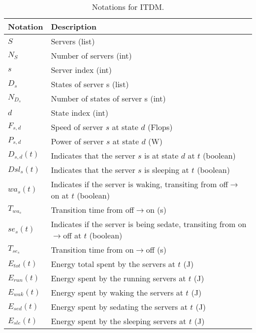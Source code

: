 \begin{table*}[!htb]
\centering
\caption{Notations for ITDM.}
\label{tab:notation_it}
\begin{tabular}{l|l}
    \hline
    Notation & Description \\\hline\hline
    $S$ & Servers (list) \\
    $N_{S}$ & Number of servers (int) \\
    $s$ & Server index (int) \\
    $D_s$ & States of server s (list) \\
    $N_{D_{s}}$ & Number of states of server s (int) \\
    $d$ & State index (int) \\
    $F_{s,d}$ & Speed of server $s$ at state $d$ (Flops)\\
    $P_{s,d}$ & Power of server $s$ at state $d$ (W)\\
    $D_{s,d}(t)$ & Indicates that the server $s$ is at state $d$ at $t$ (boolean)\\
    $Dsl_{s}(t)$ & Indicates that the server $s$ is sleeping at $t$ (boolean)\\
    $wa_s(t)$ & Indicates if the server is waking, transiting from off$\rightarrow$on at $t$ (boolean) \\
    $T_{wa_s}$ & Transition time from off$\rightarrow$on (s) \\
    $se_s(t)$ & Indicates if the server is being sedate, transiting from on$\rightarrow$off at $t$ (boolean) \\
    $T_{se_s}$ & Transition time from on$\rightarrow$off (s) \\    
    $E_{tot}(t)$ & Energy total spent by the servers at $t$ (J) \\
    $E_{run}(t)$ & Energy spent by the running servers at $t$ (J) \\
    $E_{wak}(t)$ & Energy spent by waking the servers at $t$ (J) \\
    $E_{sed}(t)$ & Energy spent by sedating the servers at $t$ (J) \\
    $E_{sle}(t)$ & Energy spent by the sleeping servers at $t$ (J) \\
    \hline
\end{tabular}
\end{table*}
